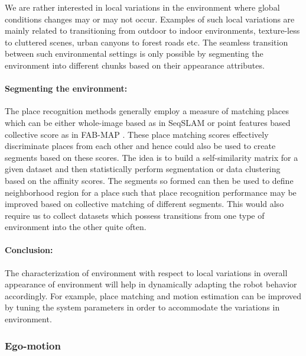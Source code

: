 \documentclass{article}
\begin{document}
We are rather interested in local variations in the environment where global conditions changes may or may not occur. Examples of such local variations are mainly related to transitioning from outdoor to indoor environments, texture-less to cluttered scenes, urban canyons to forest roads etc. The seamless transition between such environmental settings is only possible by segmenting the environment into different chunks based on their appearance attributes.

\paragraph{Segmenting the environment:}The place recognition methods generally employ a measure of matching places which can be either whole-image based as in SeqSLAM \cite{Milford2012} or point features based collective score as in FAB-MAP \cite{Cummins2009}. These place matching scores effectively discriminate places from each other and hence could also be used to create segments based on these scores. The idea is to build a self-similarity matrix for a given dataset and then statistically perform segmentation or data clustering based on the affinity scores. The segments so formed can then be used to define neighborhood region for a place such that place recognition performance may be improved based on collective matching of different segments. This would also require us to collect datasets which possess transitions from one type of environment into the other quite often.

\paragraph{Conclusion:}The characterization of environment with respect to local variations in overall appearance of environment will help in dynamically adapting the robot behavior accordingly. For example, place matching and motion estimation can be improved by tuning the system parameters in order to accommodate the variations in environment.

\subsubsection{Ego-motion}
\end{document}

